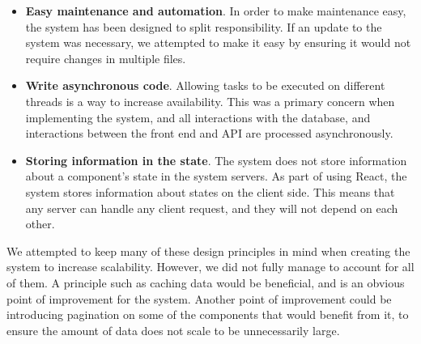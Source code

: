 \begin{itemize}
    \item \textbf{Easy maintenance and automation}. In order to make maintenance easy, the system has been designed to split responsibility.
    If an update to the system was necessary, we attempted to make it easy by ensuring it would not require changes in multiple files.
    \item \textbf{Write asynchronous code}. Allowing tasks to be executed on different threads is a way to increase availability. 
    This was a primary concern when implementing the system, and all interactions with the database, and interactions between the front end and API are processed asynchronously.
    \item \textbf{Storing information in the state}. The system does not store information about a component's state in the system servers.
    As part of using React, the system stores information about states on the client side.
    This means that any server can handle any client request, and they will not depend on each other.
\end{itemize}
We attempted to keep many of these design principles in mind when creating the system to increase scalability.
However, we did not fully manage to account for all of them.
A principle such as caching data would be beneficial, and is an obvious point of improvement for the system.
Another point of improvement could be introducing pagination on some of the components that would benefit from it, to ensure the amount of data does not scale to be unnecessarily large.